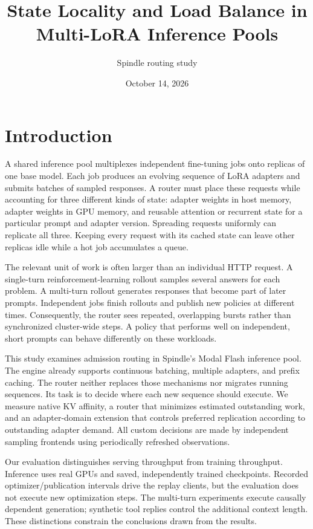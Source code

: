 \documentclass[10pt,twocolumn,letterpaper]{article}
\title{State Locality and Load Balance in Multi-LoRA Inference Pools}
\author{Spindle routing study}
\date{October 14, 2026}
\begin{document}
\raggedbottom
\maketitle
\begin{abstract}

\end{abstract}

\section{Introduction}
A shared inference pool multiplexes independent fine-tuning jobs onto replicas of
one base model. Each job produces an evolving sequence of LoRA adapters and
submits batches of sampled responses. A router must place these requests while
accounting for three different kinds of state: adapter weights in host memory,
adapter weights in GPU memory, and reusable attention or recurrent state for a
particular prompt and adapter version. Spreading requests uniformly can replicate
all three. Keeping every request with its cached state can leave other replicas
idle while a hot job accumulates a queue.

The relevant unit of work is often larger than an individual HTTP request. A
single-turn reinforcement-learning rollout samples several answers for each
problem. A multi-turn rollout generates responses that become part of later
prompts. Independent jobs finish rollouts and publish new policies at different
times. Consequently, the router sees repeated, overlapping bursts rather than
synchronized cluster-wide steps. A policy that performs well on independent,
short prompts can behave differently on these workloads.

This study examines admission routing in Spindle's Modal Flash inference pool.
The engine already supports continuous batching, multiple adapters, and prefix
caching. The router neither replaces those mechanisms nor migrates running
sequences. Its task is to decide where each new sequence should execute. We
measure native KV affinity, a router that minimizes estimated outstanding work,
and an adapter-domain extension that controls preferred replication according to
outstanding adapter demand. All custom decisions are made by independent
sampling frontends using periodically refreshed observations.

Our evaluation distinguishes serving throughput from training throughput.
Inference uses real GPUs and saved, independently trained checkpoints. Recorded
optimizer/publication intervals drive the replay clients, but the evaluation
does not execute new optimization steps. The multi-turn experiments execute
causally dependent generation; synthetic tool replies control the additional
context length. These distinctions constrain the conclusions drawn from the
results.
\end{document}

